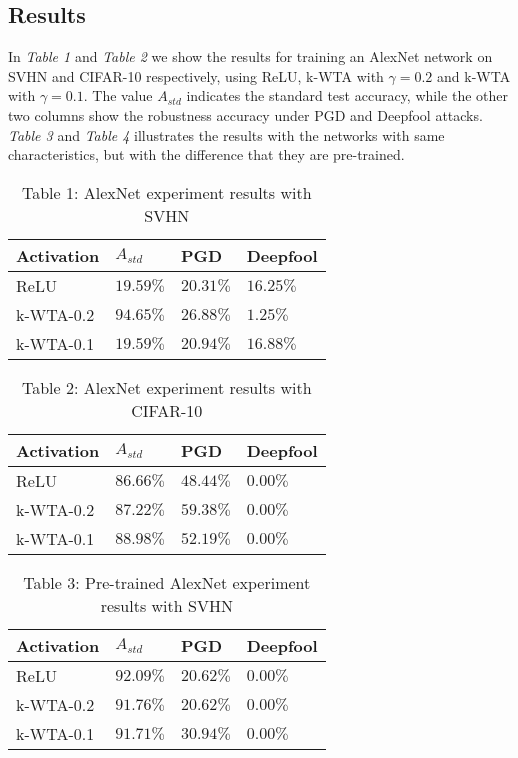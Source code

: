 \documentclass[a4paper]{article}
\begin{document}
	\subsection{Results}
	In \textit{Table 1} and \textit{Table 2} we show the results for training an AlexNet network on SVHN and CIFAR-10 respectively, using ReLU, k-WTA with $\gamma = 0.2$ and k-WTA with $\gamma = 0.1$. The value $A_{std}$ indicates the standard test accuracy, while the other two columns show the robustness accuracy under PGD and Deepfool attacks. \textit{Table 3} and \textit{Table 4} illustrates the results with the networks with same characteristics, but with the difference that they are pre-trained.
	\begin{table}[!htbp]
		\begin{tabular}{|p{}|p{}|p{}|p{}|}
			\hline
			Activation	& $A_{std}$	&	PGD	&	Deepfool	\\
			\hline
			ReLU		&$19.59\%$&$20.31\%$&$16.25\%$	\\
			\hline
			k-WTA-0.2	&$94.65\%$&$26.88\%$&$1.25\%$	\\
			\hline
			k-WTA-0.1	&$19.59\%$&$20.94\%$&$16.88\%$	\\
			\hline
		\end{tabular}
		\caption{Table 1: AlexNet experiment results with SVHN}\label{alexnetSVHN}
	\end{table}
	\begin{table}[!htbp]
		\begin{tabular}{|p{}|p{}|p{}|p{}|}
			\hline
			Activation	& $A_{std}$	&	PGD	&	Deepfool	\\
			\hline
			ReLU		&$86.66\%$&$48.44\%$&$0.00\%$	\\
			\hline
			k-WTA-0.2	&$87.22\%$&$59.38\%$&$0.00\%$	\\
			\hline
			k-WTA-0.1	&$88.98\%$&$52.19\%$&$0.00\%$	\\
			\hline
		\end{tabular}
		\caption{Table 2: AlexNet experiment results with CIFAR-10}\label{alexnetCIFAR10}
	\end{table}
	\begin{table}[!htbp]
		\begin{tabular}{|p{}|p{}|p{}|p{}|}
			\hline
			Activation	& $A_{std}$	&	PGD	&	Deepfool	\\
			\hline
			ReLU		&$92.09\%$&$20.62\%$&$0.00\%$	\\
			\hline
			k-WTA-0.2	&$91.76\%$&$20.62\%$&$0.00\%$	\\
			\hline
			k-WTA-0.1	&$91.71\%$&$30.94\%$&$0.00\%$	\\
			\hline
		\end{tabular}
		\caption{Table 3: Pre-trained AlexNet experiment results with SVHN}\label{pre-alexnetSVHN}
	\end{table}
\end{document}
